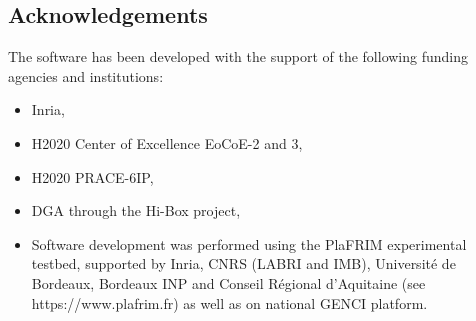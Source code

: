 \subsection{Acknowledgements}
\label{sec::Composyx:acknowledgements}

The software has been developed with the support of the following funding agencies and institutions:
\begin{itemize}
  \item Inria,
  \item H2020 Center of Excellence EoCoE-2 and 3,
  \item H2020 PRACE-6IP,
  \item DGA through the Hi-Box project,
  \item Software development was performed using the PlaFRIM experimental testbed, supported by Inria, CNRS (LABRI and IMB), Université de Bordeaux, Bordeaux INP and Conseil R\'egional d’Aquitaine (see https://www.plafrim.fr) as well as on national GENCI platform.
\end{itemize}
